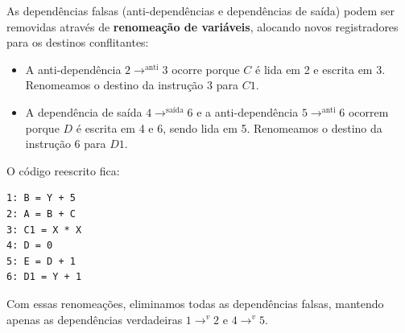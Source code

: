 \documentclass{article}
\begin{document}
As dependências falsas (anti-dependências e dependências de saída) podem ser removidas através de \textbf{renomeação de variáveis}, alocando novos registradores para os destinos conflitantes:

\begin{itemize}
    \item A anti-dependência $2 \rightarrow^{\text{anti}} 3$ ocorre porque $C$ é lida em 2 e escrita em 3. Renomeamos o destino da instrução 3 para $C1$.
    \item A dependência de saída $4 \rightarrow^{\text{saída}} 6$ e a anti-dependência $5 \rightarrow^{\text{anti}} 6$ ocorrem porque $D$ é escrita em 4 e 6, sendo lida em 5. Renomeamos o destino da instrução 6 para $D1$.
\end{itemize}

O código reescrito fica:
\begin{verbatim}
1: B = Y + 5
2: A = B + C
3: C1 = X * X
4: D = 0
5: E = D + 1
6: D1 = Y + 1
\end{verbatim}

Com essas renomeações, eliminamos todas as dependências falsas, mantendo apenas as dependências verdadeiras $1 \rightarrow^{v} 2$ e $4 \rightarrow^{v} 5$.
\end{document}
